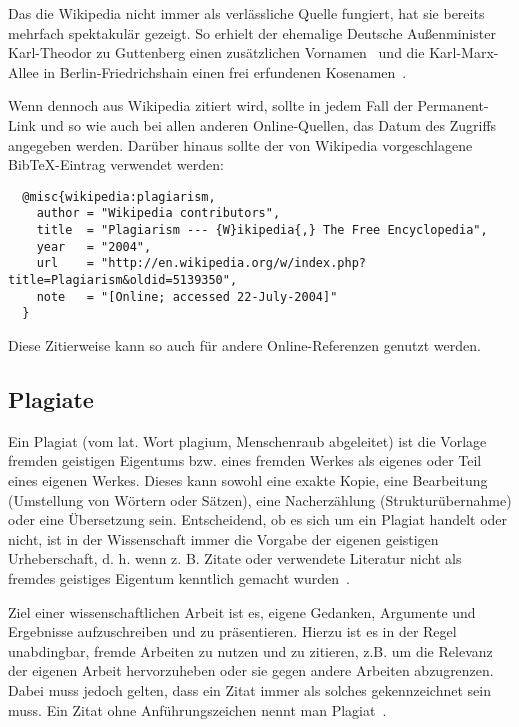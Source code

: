 Das die Wikipedia nicht immer als verlässliche Quelle fungiert, hat sie bereits mehrfach spektakulär gezeigt. So erhielt der ehemalige Deutsche Außenminister Karl-Theodor zu Guttenberg einen zusätzlichen Vornamen~\cite{bildblog:guttenberg,spiegel:guttenberg} und die Karl-Marx-Allee in Berlin-Friedrichshain einen frei erfundenen Kosenamen~\cite{rundschau:wikipedia}.

Wenn dennoch aus Wikipedia zitiert wird, sollte in jedem Fall der Permanent-Link und so wie auch bei allen anderen Online-Quellen, das Datum des Zugriffs angegeben werden. Darüber hinaus sollte der von Wikipedia vorgeschlagene BibTeX-Eintrag verwendet werden:

\begin{lstlisting}
  @misc{wikipedia:plagiarism,
    author = "Wikipedia contributors",
    title  = "Plagiarism --- {W}ikipedia{,} The Free Encyclopedia",
    year   = "2004",
    url    = "http://en.wikipedia.org/w/index.php?title=Plagiarism&oldid=5139350",
    note   = "[Online; accessed 22-July-2004]"
  }
\end{lstlisting}
\smallskip

Diese Zitierweise kann so auch für andere Online-Referenzen genutzt werden.

\subsection{Plagiate}\label{sec:citations:plagiarism}
%
Ein Plagiat (vom lat. Wort plagium, \glqq Menschenraub\grqq{} abgeleitet) ist die Vorlage fremden geistigen Eigentums bzw. eines fremden Werkes als eigenes oder Teil eines eigenen Werkes. Dieses kann sowohl eine exakte Kopie, eine Bearbeitung (Umstellung von Wörtern oder Sätzen), eine Nacherzählung (Strukturübernahme) oder eine Übersetzung sein. Entscheidend, ob es sich um ein Plagiat handelt oder nicht, ist in der Wissenschaft immer die Vorgabe der eigenen geistigen Urheberschaft, d. h. wenn z. B. Zitate oder verwendete Literatur nicht als fremdes geistiges Eigentum kenntlich gemacht wurden~\cite{wikipedia:plagiarism,wulff:2013:01}.

Ziel einer wissenschaftlichen Arbeit ist es, eigene Gedanken, Argumente und Ergebnisse aufzuschreiben und zu präsentieren. Hierzu ist es in der Regel unabdingbar, fremde Arbeiten zu nutzen und zu zitieren, z.B. um die Relevanz der eigenen Arbeit hervorzuheben oder sie gegen andere Arbeiten abzugrenzen. Dabei muss jedoch gelten, dass ein Zitat immer als solches gekennzeichnet sein muss. Ein \glqq Zitat ohne Anführungszeichen\grqq{} nennt man Plagiat~\cite{eco:2010:01}.

